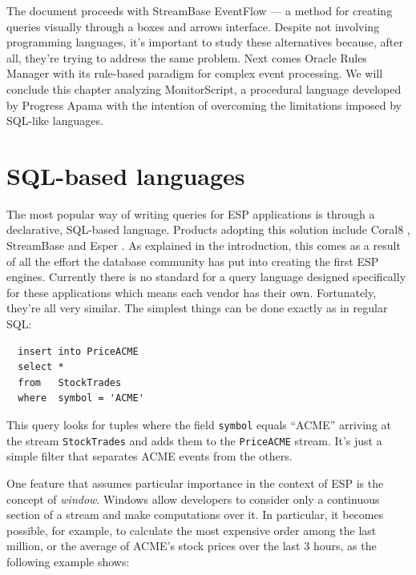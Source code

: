 \documentclass[a4,11pt]{report}
\begin{document}
The document proceeds with StreamBase EventFlow --- a method for
creating queries visually through a boxes and arrows
interface. Despite not involving programming languages, it's important
to study these alternatives because, after all, they're trying to
address the same problem. Next comes Oracle Rules Manager with its
rule-based paradigm for complex event processing. We will conclude
this chapter analyzing MonitorScript, a procedural language developed
by Progress Apama with the intention of overcoming the limitations
imposed by SQL-like languages.

\section{SQL-based languages}
\label{sec:sql}

The most popular way of writing queries for ESP applications is
through a declarative, SQL-based language. Products adopting this
solution include Coral8 \cite{coral8:www}, StreamBase
\cite{streambase:www} and Esper \cite{esper:www}. As explained in the
introduction, this comes as a result of all the effort the database
community has put into creating the first ESP engines. Currently there
is no standard for a query language designed specifically for these
applications which means each vendor has their own. Fortunately,
they're all very similar. The simplest things can be done exactly as
in regular SQL:

\lstset{
  language=CCL,
  columns=fullflexible,
  basicstyle=\tt,
  keywordstyle=[1]\bf,
  keywordstyle=[2]\it,
}

\begin{lstlisting}
  insert into PriceACME
  select *
  from   StockTrades
  where  symbol = 'ACME'
\end{lstlisting}

This query looks for tuples where the field \verb=symbol= equals
``ACME'' arriving at the stream \verb=StockTrades= and adds them to
the \verb=PriceACME= stream. It's just a simple filter that separates
ACME events from the others.

One feature that assumes particular importance in the context of ESP
is the concept of \emph{window}. Windows allow developers to consider
only a continuous section of a stream and make computations over
it. In particular, it becomes possible, for example, to calculate the
most expensive order among the last million, or the average of ACME's
stock prices over the last 3 hours, as the following example shows:
\end{document}
